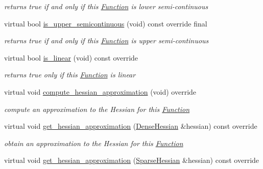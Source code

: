 \begin{Indent}
\begin{DoxyCompactItemize}
\begin{DoxyCompactList}\small\item\em returns true if and only if this \mbox{\hyperlink{class_s_m_spp__di__unipi__it_1_1_function}{Function}} is lower semi-\/continuous \end{DoxyCompactList}\item 
virtual bool \mbox{\hyperlink{class_s_m_spp__di__unipi__it_1_1_d_quad_function_acb905dad2242bc107ae51cab2a7f1af3}{is\+\_\+upper\+\_\+semicontinuous}} (void) const override final
\begin{DoxyCompactList}\small\item\em returns true if and only if this \mbox{\hyperlink{class_s_m_spp__di__unipi__it_1_1_function}{Function}} is upper semi-\/continuous \end{DoxyCompactList}\item 
virtual bool \mbox{\hyperlink{class_s_m_spp__di__unipi__it_1_1_d_quad_function_a8afe6138b9ef7838ec5b851cbc3ad2fc}{is\+\_\+linear}} (void) const override
\begin{DoxyCompactList}\small\item\em returns true only if this \mbox{\hyperlink{class_s_m_spp__di__unipi__it_1_1_function}{Function}} is linear \end{DoxyCompactList}\item 
virtual void \mbox{\hyperlink{class_s_m_spp__di__unipi__it_1_1_d_quad_function_a8f0ae6fd266900dca237c8c29b69cd5f}{compute\+\_\+hessian\+\_\+approximation}} (void) override
\begin{DoxyCompactList}\small\item\em compute an approximation to the Hessian for this \mbox{\hyperlink{class_s_m_spp__di__unipi__it_1_1_function}{Function}} \end{DoxyCompactList}\item 
virtual void \mbox{\hyperlink{class_s_m_spp__di__unipi__it_1_1_d_quad_function_a15b274da02800dcbec12695a689b327f}{get\+\_\+hessian\+\_\+approximation}} (\mbox{\hyperlink{class_s_m_spp__di__unipi__it_1_1_c15_function_ae7dd5ecf6e8711dc10787bb8d80b355b}{Dense\+Hessian}} \&hessian) const override
\begin{DoxyCompactList}\small\item\em obtain an approximation to the Hessian for this \mbox{\hyperlink{class_s_m_spp__di__unipi__it_1_1_function}{Function}} \end{DoxyCompactList}\item 
virtual void \mbox{\hyperlink{class_s_m_spp__di__unipi__it_1_1_d_quad_function_aca502bb3d537cfa9aaee68cbbc03a410}{get\+\_\+hessian\+\_\+approximation}} (\mbox{\hyperlink{class_s_m_spp__di__unipi__it_1_1_c15_function_af95b7c5c0969f493222b30b17aa58515}{Sparse\+Hessian}} \&hessian) const override

\end{DoxyCompactItemize}
\end{Indent}
